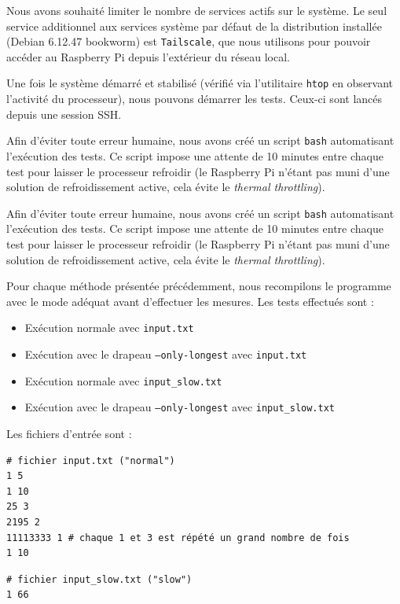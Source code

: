 \documentclass[a4paper,11pt]{article}
\begin{document}
Nous avons souhaité limiter le nombre de services actifs sur le système. Le seul service additionnel aux services système par défaut de la distribution installée (Debian 6.12.47 bookworm) est \texttt{Tailscale}, que nous utilisons pour pouvoir accéder au Raspberry Pi depuis l'extérieur du réseau local.

Une fois le système démarré et stabilisé (vérifié via l'utilitaire \texttt{htop} en observant l'activité du processeur), nous pouvons démarrer les tests. Ceux-ci sont lancés depuis une session SSH.

Afin d'éviter toute erreur humaine, nous avons créé un script \texttt{bash} automatisant l'exécution des tests. Ce script impose une attente de 10 minutes entre chaque test pour laisser le processeur refroidir (le Raspberry Pi n'étant pas muni d'une solution de refroidissement active, cela évite le \textit{thermal throttling}).

Afin d'éviter toute erreur humaine, nous avons créé un script \texttt{bash} automatisant l'exécution des tests. Ce script impose une attente de 10 minutes entre chaque test pour laisser le processeur refroidir (le Raspberry Pi n'étant pas muni d'une solution de refroidissement active, cela évite le \textit{thermal throttling}).

Pour chaque méthode présentée précédemment, nous recompilons le programme avec le mode adéquat avant d'effectuer les mesures.
Les tests effectués sont :
\begin{itemize}
    \item Exécution normale avec \texttt{input.txt}
    \item Exécution avec le drapeau \texttt{--only-longest} avec \texttt{input.txt}
    \item Exécution normale avec \texttt{input\_slow.txt}
    \item Exécution avec le drapeau \texttt{--only-longest} avec \texttt{input\_slow.txt}
\end{itemize}

Les fichiers d'entrée sont :

\begin{verbatim}
# fichier input.txt ("normal")
1 5
1 10
25 3
2195 2
11113333 1 # chaque 1 et 3 est répété un grand nombre de fois
1 10
\end{verbatim}

\begin{verbatim}
# fichier input_slow.txt ("slow")
1 66
\end{verbatim}
\end{document}
